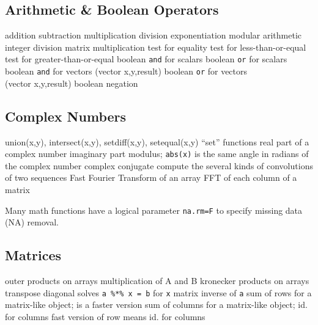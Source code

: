 \subsection{Arithmetic \& Boolean Operators}{}
	{addition}
	{subtraction}
	{multiplication}
	{division}
	{exponentiation}
	{modular arithmetic}
	{integer division}
	{matrix multiplication}
	{test for equality}
	{test for less-than-or-equal}
	{test for greater-than-or-equal}
	{boolean {\tt and} for scalars}
	{boolean {\tt or} for scalars}
	{boolean {\tt and} for vectors (vector x,y,result)}
	{boolean {\tt or} for vectors\\(vector x,y,result)}
	{boolean negation}

\subsection{Complex Numbers}{{\smalltt union(x,y),  intersect(x,y),  setdiff(x,y),  setequal(x,y)}}
	{``set'' functions}
	{real part of a complex number}
	{imaginary part}
	{modulus; {\tt abs(x)} is the same}
	{angle in radians of the complex number}
	{complex conjugate}
	{compute the several kinds of convolutions of two sequences}
	{Fast Fourier Transform of an array}
	{FFT of each column of a matrix}

Many math functions have a logical parameter {\tt na.rm=F} to
specify missing data (NA) removal.

\subsection{Matrices}{}
	{outer products on arrays}
	{multiplication of A and B}
	{kronecker products on arrays}
	{transpose}
	{diagonal}
	{solves {\tt a \%*\% x = b} for {\tt x}}
	{matrix inverse of {\tt a}}
	{sum of rows for a matrix-like object;}
	{is a faster version}
	{sum of columns for a matrix-like object;}
	{id. for columns}
	{fast version of row means}
	{id. for columns}

